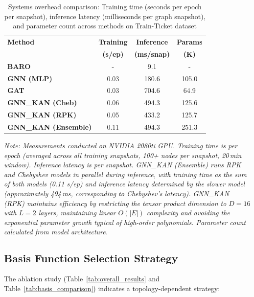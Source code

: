 \documentclass[conference]{IEEEtran}
\begin{document}
\begin{table}[t]
\centering
\caption{Systems overhead comparison: Training time (seconds per epoch per snapshot), inference latency (milliseconds per graph snapshot), and parameter count across methods on Train-Ticket dataset}
\label{tab:systems_overhead}
\footnotesize
\renewcommand{\arraystretch}{1.0}
\setlength{\tabcolsep}{3pt}
\begin{tabular}{l|ccc}
\toprule
\textbf{Method} & \textbf{Training} & \textbf{Inference} & \textbf{Params} \\
& \textbf{(s/ep)} & \textbf{(ms/snap)} & \textbf{(K)} \\
\midrule
\textbf{BARO} & - & 9.1 & - \\
\textbf{GNN (MLP)} & 0.03 & 180.6 & 105.0 \\
\textbf{GAT} & 0.03 & 704.6 & 64.9 \\
\textbf{GNN\_KAN (Cheb)} & 0.06 & 494.3 & 125.6 \\
\textbf{GNN\_KAN (RPK)} & 0.05 & 433.2 & 125.7 \\
\textbf{GNN\_KAN (Ensemble)} & 0.11 & 494.3 & 251.3 \\
\bottomrule
\end{tabular}
\vspace{0.2cm}

\footnotesize \textit{Note: Measurements conducted on NVIDIA 2080ti GPU. Training time is per epoch (averaged across all training snapshots, 100+ nodes per snapshot, 20\,min window). Inference latency is per snapshot. GNN\_KAN (Ensemble) runs RPK and Chebyshev models in parallel during inference, with training time as the sum of both models (0.11 s/ep) and inference latency determined by the slower model (approximately 494\,ms, corresponding to Chebyshev's latency). GNN\_KAN (RPK) maintains efficiency by restricting the tensor product dimension to $D=16$ with $L=2$ layers, maintaining linear $O(|E|)$ complexity and avoiding the exponential parameter growth typical of high-order polynomials. Parameter count calculated from model architecture.}
\end{table}

\subsection{Basis Function Selection Strategy}

The ablation study (Table~\ref{tab:overall_results} and Table~\ref{tab:basis_comparison}) indicates a topology-dependent strategy:
\end{document}
